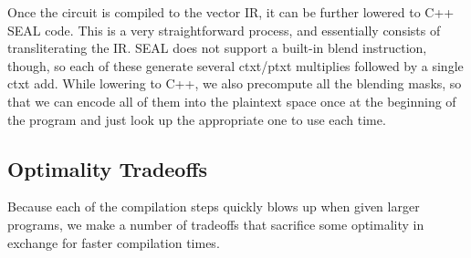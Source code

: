 Once the circuit is compiled to the vector IR, it can be further lowered to C++ SEAL code.
This is a very straightforward process, and essentially consists of transliterating the IR. 
SEAL does not support a built-in blend instruction, though, so each of these generate several ctxt/ptxt multiplies followed by a single ctxt add.
While lowering to C++, we also precompute all the blending masks, so that we can encode all of them into the plaintext space once at the beginning of the program and just look up the appropriate one to use each time.


\subsection{Optimality Tradeoffs}
Because each of the compilation steps quickly blows up when given larger programs, we make a number of tradeoffs that sacrifice some optimality in exchange for faster compilation times.
